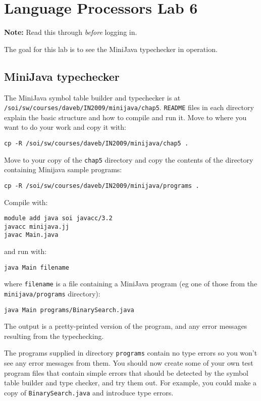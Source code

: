 \documentclass{article}
\begin{document}
\thispagestyle{empty}

\section*{Language Processors Lab 6}

{\bf Note:} Read this through {\em before\/} logging in.

\medskip\noindent The goal for this lab is to see the MiniJava typechecker in operation.


\subsection*{MiniJava typechecker}

The MiniJava symbol table builder and typechecker is at
 \verb+/soi/sw/courses/daveb/IN2009/minijava/chap5+.
\verb+README+ files in each directory explain the basic structure
and how to compile and run it.
Move to where you want to do your work and copy it with:
\begin{verbatim}
cp -R /soi/sw/courses/daveb/IN2009/minijava/chap5 .
\end{verbatim}
Move to your copy of the \verb+chap5+ directory and copy the contents of the directory containing Minijava sample programs:
\begin{verbatim}
cp -R /soi/sw/courses/daveb/IN2009/minijava/programs .
\end{verbatim}
Compile with:
\begin{verbatim}
module add java soi javacc/3.2
javacc minijava.jj
javac Main.java
\end{verbatim}
and run with:
\begin{verbatim}
java Main filename
\end{verbatim}
where \verb+filename+ is a file containing a MiniJava program (eg one of
those from the \verb+minijava/programs+ directory):
\begin{verbatim}
java Main programs/BinarySearch.java
\end{verbatim}
The output is a pretty-printed version of the program, and any error messages
resulting from the typechecking.

The programs supplied in directory \verb+programs+ contain no type errors so you won't see any error messages from them. You should now create some of
your own test program files that contain simple errors that
should be detected by the symbol table builder and type checker, and try them out. For example, you could make a copy of \verb+BinarySearch.java+ and introduce type errors.
\end{document}
